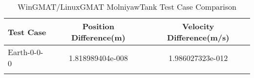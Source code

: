 \begin{table}[htbp!]
\centering
\caption{ WinGMAT/LinuxGMAT MolniyawTank Test Case Comparison}
      \begin{tabular}{lcc}
      \hline\hline
          Test Case & Position Difference(m) & Velocity Difference(m/s) \\
         \hline
         Earth-0-0-0 & 1.818989404e-008 & 1.986027323e-012 \\
      \hline\hline
      \label{Table: MolniyawTank WinGMAT-LinuxGMAT Table} 
\end{tabular}
\end{table}
